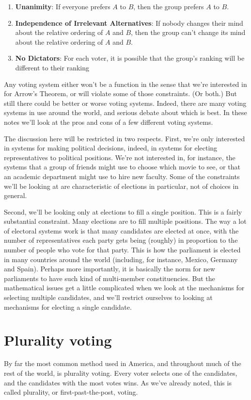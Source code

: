 \begin{multicols}{2}
\begin{enumerate}
\item \textbf{Unanimity}: If everyone prefers $A$ to $B$, then the group prefers $A$ to $B$.
\item \textbf{Independence of Irrelevant Alternatives}: If nobody changes their mind about the relative ordering of $A$ and $B$, then the group can't change its mind about the relative ordering of $A$ and $B$.
\item \textbf{No Dictators}: For each voter, it is possible that the group's ranking will be different to their ranking
\end{enumerate}
Any voting system either won't be a function in the sense that we're interested in for Arrow's Theorem, or will violate some of those constraints. (Or both.) But still there could be better or worse voting systems. Indeed, there are many voting systems in use around the world, and serious debate about which is best. In these notes we'll look at the pros and cons of a few different voting systems.

The discussion here will be restricted in two respects. First, we're only interested in systems for making political decisions, indeed, in systems for electing representatives to political positions. We're not interested in, for instance, the systems that a group of friends might use to choose which movie to see, or that an academic department might use to hire new faculty. Some of the constraints we'll be looking at are characteristic of elections in particular, not of choices in general.

Second, we'll be looking only at elections to fill a single position. This is a fairly substantial constraint. Many elections are to fill multiple positions. The way a lot of electoral systems work is that many candidates are elected at once, with the number of representatives each party gets being (roughly) in proportion to the number of people who vote for that party. This is how the parliament is elected in many countries around the world (including, for instance, Mexico, Germany and Spain). Perhaps more importantly, it is basically the norm for new parliaments to have such kind of multi-member constituencies. But the mathematical issues get a little complicated when we look at the mechanisms for selecting multiple candidates, and we'll restrict ourselves to looking at mechanisms for electing a single candidate.

\section{Plurality voting}
By far the most common method used in America, and throughout much of the rest of the world, is plurality voting. Every voter selects one of the candidates, and the candidates with the most votes wins. As we've already noted, this is called plurality, or first-past-the-post, voting.


\end{multicols}
